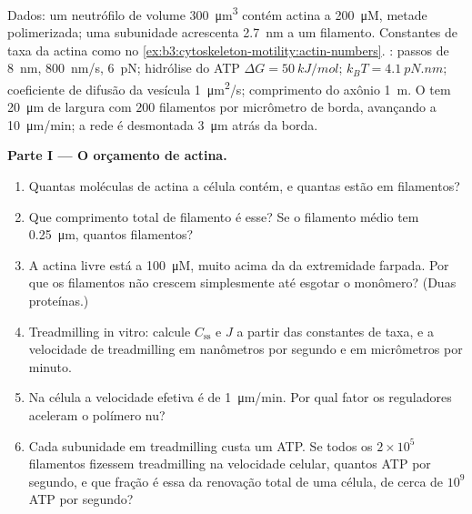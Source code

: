 \begin{problem}
\label{pb:b3:cytoskeleton-motility:1}
Dados: um neutrófilo de volume \qty{300}{\micro m^3} contém actina a
\qty{200}{\micro M}, metade polimerizada; uma subunidade acrescenta
\qty{2.7}{nm} a um filamento. Constantes de taxa da actina como no
\cref{ex:b3:cytoskeleton-motility:actin-numbers}. : passos de
\qty{8}{nm}, \qty{800}{nm/s},  \qty{6}{pN}; hidrólise do
ATP $\Delta G = \qty{50}{kJ/mol}$; $k_{B}T = \qty{4.1}{pN.nm}$;
coeficiente de difusão da vesícula \qty{1}{\micro m^2/s}; comprimento
do axônio \qty{1}{m}. O  tem \qty{20}{\micro m} de largura
com $200$ filamentos por micrômetro de borda, avançando a
\qty{10}{\micro m/min}; a rede é desmontada \qty{3}{\micro m} atrás da
borda.

\medskip
\noindent\textbf{Parte I --- O orçamento de actina.}
\begin{enumerate}
  \item Quantas moléculas de actina a célula contém, e quantas estão em
        filamentos?
  \item Que comprimento total de filamento é esse? Se o filamento médio
        tem \qty{0.25}{\micro m}, quantos filamentos?
  \item A actina livre está a \qty{100}{\micro M}, muito acima da
         da extremidade farpada. Por que os
        filamentos não crescem simplesmente até esgotar o monômero?
        (Duas proteínas.)
  \item Treadmilling in vitro: calcule $C_{\text{ss}}$ e $J$ a partir
        das constantes de taxa, e a velocidade de treadmilling em
        nanômetros por segundo e em micrômetros por minuto.
  \item Na célula a velocidade efetiva é de \qty{1}{\micro m/min}. Por
        qual fator os reguladores aceleram o polímero nu?
  \item Cada subunidade em treadmilling custa um ATP. Se todos os
        $2\times 10^{5}$ filamentos fizessem treadmilling na velocidade
        celular, quantos ATP por segundo, e que fração é essa da
        renovação total de uma célula, de cerca de $10^{9}$ ATP por
        segundo?
\end{enumerate}


\end{problem}
